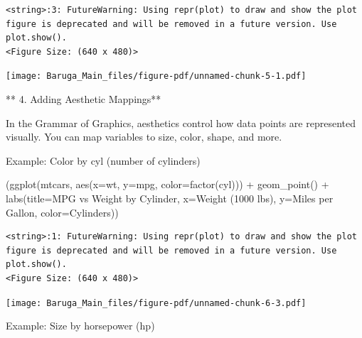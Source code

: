 \documentclass[
  letterpaper,
  DIV=11,
  numbers=noendperiod]{scrreprt}
\newenvironment{Shaded}{\begin{snugshade}}{\end{snugshade}}
\newcommand{\NormalTok}[1]{\textcolor[rgb]{0.00,0.23,0.31}{#1}}
\newcommand{\OperatorTok}[1]{\textcolor[rgb]{0.37,0.37,0.37}{#1}}
\newcommand{\StringTok}[1]{\textcolor[rgb]{0.13,0.47,0.30}{#1}}
\begin{document}
\begin{verbatim}
<string>:3: FutureWarning: Using repr(plot) to draw and show the plot figure is deprecated and will be removed in a future version. Use plot.show().
<Figure Size: (640 x 480)>
\end{verbatim}

\texttt{[image: Baruga\_Main\_files/figure-pdf/unnamed-chunk-5-1.pdf]}

** 4. Adding Aesthetic Mappings**

In the Grammar of Graphics, aesthetics control how data points are
represented visually. You can map variables to size, color, shape, and
more.

Example: Color by cyl (number of cylinders)

\begin{Shaded}
\begin{Highlighting}[]
\NormalTok{(ggplot(mtcars, aes(x}\OperatorTok{=}\StringTok{\textquotesingle{}wt\textquotesingle{}}\NormalTok{, y}\OperatorTok{=}\StringTok{\textquotesingle{}mpg\textquotesingle{}}\NormalTok{, color}\OperatorTok{=}\StringTok{\textquotesingle{}factor(cyl)\textquotesingle{}}\NormalTok{)) }\OperatorTok{+}
\NormalTok{ geom\_point() }\OperatorTok{+}
\NormalTok{ labs(title}\OperatorTok{=}\StringTok{\textquotesingle{}MPG vs Weight by Cylinder\textquotesingle{}}\NormalTok{,}
\NormalTok{      x}\OperatorTok{=}\StringTok{\textquotesingle{}Weight (1000 lbs)\textquotesingle{}}\NormalTok{,}
\NormalTok{      y}\OperatorTok{=}\StringTok{\textquotesingle{}Miles per Gallon\textquotesingle{}}\NormalTok{,}
\NormalTok{      color}\OperatorTok{=}\StringTok{\textquotesingle{}Cylinders\textquotesingle{}}\NormalTok{))}
\end{Highlighting}
\end{Shaded}

\begin{verbatim}
<string>:1: FutureWarning: Using repr(plot) to draw and show the plot figure is deprecated and will be removed in a future version. Use plot.show().
<Figure Size: (640 x 480)>
\end{verbatim}

\texttt{[image: Baruga\_Main\_files/figure-pdf/unnamed-chunk-6-3.pdf]}

Example: Size by horsepower (hp)
\end{document}
